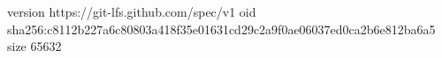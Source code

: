 version https://git-lfs.github.com/spec/v1
oid sha256:c8112b227a6c80803a418f35e01631cd29c2a9f0ae06037ed0ca2b6e812ba6a5
size 65632
